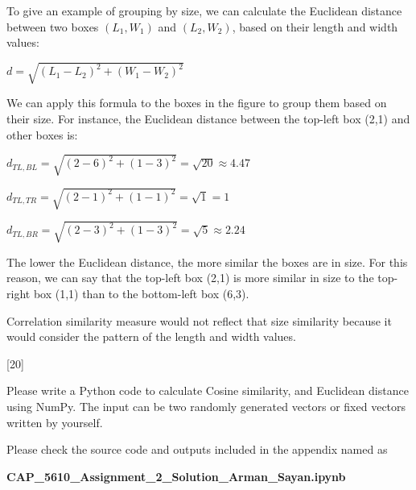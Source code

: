 \documentclass[12pt,letterpaper, onecolumn]{exam}
\begin{document}
\begin{questions}
\begin{parts}
\begin{solution}
            To give an example of grouping by size, we can calculate the Euclidean distance between two boxes $(L_1, W_1)$ and $(L_2, W_2)$, based on their length 
            and width values:

            \begin{center}
                $\displaystyle{d = \sqrt{(L_1 - L_2)^2 + (W_1 - W_2)^2}}$
            \end{center}

            We can apply this formula to the boxes in the figure to group them based on their size. 
            For instance, the Euclidean distance between the top-left box (2,1) and other boxes is:

            \begin{center}
                $\displaystyle{d_{TL,BL} = \sqrt{(2 - 6)^2 + (1 - 3)^2} = \sqrt{20} \approx 4.47}$

                $\displaystyle{d_{TL,TR} = \sqrt{(2 - 1)^2 + (1 - 1)^2} = \sqrt{1} = 1}$

                $\displaystyle{d_{TL,BR} = \sqrt{(2 - 3)^2 + (1 - 3)^2} = \sqrt{5} \approx 2.24}$
            \end{center}

            The lower the Euclidean distance, the more similar the boxes are in size.
            For this reason, we can say that the top-left box (2,1) is more similar in size to the top-right box (1,1) than to the bottom-left box (6,3).

            Correlation similarity measure would not reflect that size similarity because it would consider the pattern of the length and width values.

        \end{solution}
        
    \end{parts}

    \pagebreak

    [20]

    Please write a Python code to calculate Cosine similarity, and Euclidean distance using NumPy. 
    The input can be two randomly generated vectors or fixed vectors written by yourself.

    \begin{solution}

        Please check the source code and outputs included in the appendix named as

        \begin{center}
            \textbf{CAP\_5610\_Assignment\_2\_Solution\_Arman\_Sayan.ipynb}
        \end{center}
        

\end{solution}
\end{questions}
\end{document}
